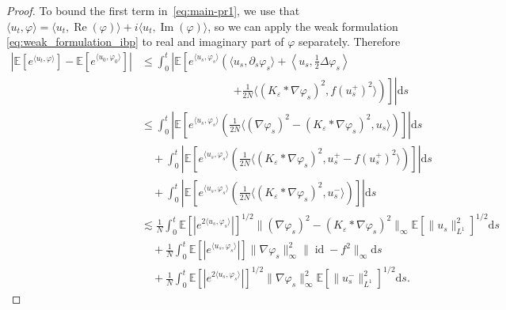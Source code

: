 \documentclass[a4paper,12pt]{article}
\newcommand{\mathd}{\mathrm{d}}
\begin{document}
\begin{proof}
  To bound the first term in~\eqref{eq:main-pr1}, we use that $\langle u_t, \varphi\rangle = \langle u_t, \operatorname{Re}(\varphi)\rangle + i \langle u_t, \operatorname{Im}(\varphi)\rangle$, so we can apply the weak formulation  \eqref{eq:weak_formulation_ibp} to real and imaginary part of $\varphi$ separately.
  Therefore
  \begin{align} \nonumber
    | \mathbb{E} [e^{\langle u_t, \varphi \rangle}] -\mathbb{E} [e^{\langle
    u_0, \varphi_0 \rangle}] | & \leq \int_0^t \left| \mathbb{E} \left[
    e^{\langle u_s, \varphi_s \rangle} \left( \langle u_s, \partial_s
    \varphi_s \rangle + \left\langle u_s, \frac{1}{2} \Delta \varphi_s
    \right\rangle \right.\right.\right.\\ \nonumber
    &\hspace{100pt} \left.\left.\left. + \frac{1}{2 N} \langle ( K_{\varepsilon} \ast \nabla
    \varphi_s )^2, f (u^+_s)^2 \rangle \right) \right] \right| \mathd s\\ \nonumber
    & \leq \int_0^t \left| \mathbb{E} \left[ e^{\langle u_s, \varphi_s
    \rangle} \left( \frac{1}{2 N} \langle ( \nabla \varphi_s )^2 - (
    K_{\varepsilon} \ast \nabla \varphi_s )^2, u_s \rangle \right) \right]
    \right| \mathd s\\ \nonumber
    & \quad + \int_0^t \left| \mathbb{E} \left[ e^{\langle u_s, \varphi_s
    \rangle} \left( \frac{1}{2 N} \langle ( K_{\varepsilon} \ast \nabla
    \varphi_s )^2, u_s^+ - f (u^+_s)^2 \rangle \right) \right] \right| \mathd
    s\\ \nonumber
    & \quad + \int_0^t \left| \mathbb{E} \left[ e^{\langle u_s, \varphi_s
    \rangle} \left( \frac{1}{2 N} \langle ( K_{\varepsilon} \ast \nabla
    \varphi_s )^2, u_s^- \rangle \right) \right] \right| \mathd s\\ \nonumber
    & \lesssim \frac{1}{N} \int_0^t \mathbb{E} [|e^{2 \langle u_s, \varphi_s
    \rangle}|]^{1 / 2} \| ( \nabla \varphi_s )^2 - ( K_{\varepsilon} \ast
    \nabla \varphi_s )^2 \|_{\infty} \mathbb{E} [\| u_s \|_{L^1}^2]^{1 / 2}
    \mathd s\\ \nonumber
    & \quad + \frac{1}{N} \int_0^t \mathbb{E} [|e^{\langle u_s, \varphi_s
    \rangle}|] \| \nabla \varphi_s \|_{\infty}^2 \| \operatorname{id} - f^2 \|_{\infty}
    \mathd s\\ 
    & \quad + \frac{1}{N} \int_0^t \mathbb{E} [|e^{2 \langle u_s, \varphi_s
    \rangle}|]^{1 / 2} \| \nabla \varphi_s \|_{\infty}^2 \mathbb{E} [\| u_s^-
    \|_{L^1}^2]^{1 / 2} \mathd s. \label{eq:main-pr2-s2}
  \end{align}

\end{proof}
\end{document}
